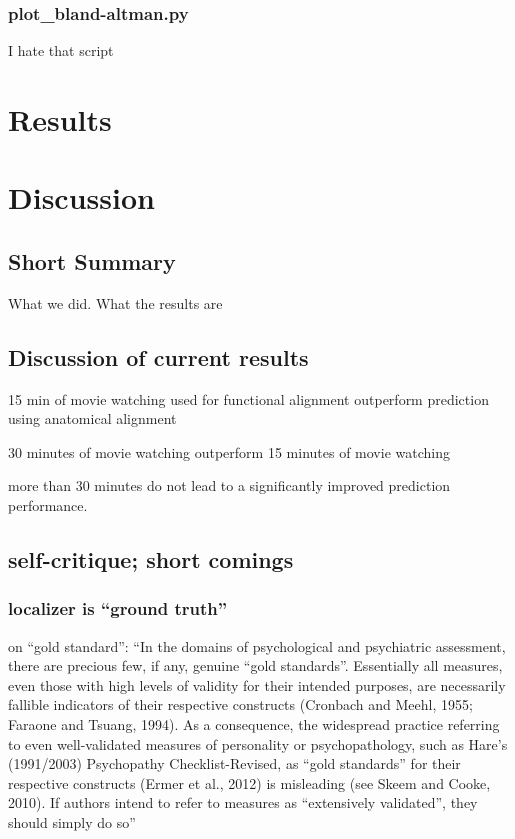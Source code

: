 \subsubsection{plot\_bland-altman.py}

I hate that script



\section{Results}




\section{Discussion}


\subsection{Short Summary}

What we did. What the results are

\subsection{Discussion of current results}

%
15 min of movie watching used for functional alignment outperform prediction
using anatomical alignment

%
30 minutes of movie watching outperform 15 minutes of movie watching

%
more than 30 minutes do not lead to a significantly improved prediction
performance.
%

\subsection{self-critique; short comings}


\subsubsection{localizer is ``ground truth''}

\citet{lilienfeld2015fifty} on ``gold standard'': ``In the domains of
psychological and psychiatric assessment, there are precious few, if any,
genuine ``gold standards''. Essentially all measures, even those with high
levels of validity for their intended purposes, are necessarily fallible
indicators of their respective constructs (Cronbach and Meehl, 1955; Faraone and
Tsuang, 1994). As a consequence, the widespread practice referring to even
well-validated measures of personality or psychopathology, such as Hare’s
(1991/2003) Psychopathy Checklist-Revised, as ``gold standards'' for their
respective constructs (Ermer et al., 2012) is misleading (see Skeem and Cooke,
2010). If authors intend to refer to measures as ``extensively validated'', they
should simply do so'' \citep{lilienfeld2015fifty}

